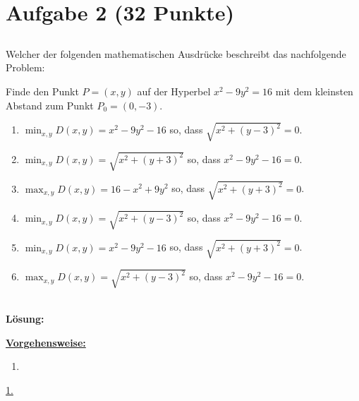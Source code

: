 \section*{Aufgabe 2 (32 Punkte)}
\vspace{0.4cm}
\subsection*{}
Welcher der folgenden mathematischen Ausdrücke beschreibt das nachfolgende Problem:
\begin{displayquote}
	Finde den Punkt $P = (x,y)$ auf der Hyperbel $x^2 - 9 y^2 = 16$ mit dem kleinsten
	Abstand zum Punkt $P_0 = (0,-3)$.
\end{displayquote}
\renewcommand{\labelenumi}{(\alph{enumi})}
\begin{enumerate}
	\item 
	$\min_{x,y} D(x,y) = x^2 - 9y^2 - 16$ so, dass
	$\sqrt{x^2 + (y-3)^2} = 0$.
	\item 
	$\min_{x,y} D(x,y) = \sqrt{x^2 + ( y + 3)^2}$ so, dass
	$x^2 - 9 y^2 - 16  = 0$.
	\item 
	$\max_{x,y} D(x,y) = 16 - x^2 + 9y^2 $ so, dass
	$\sqrt{x^2 + (y+3)^2} = 0$.
	\item 
	$\min_{x,y} D(x,y) = \sqrt{x^2 + ( y - 3)^2}$ so, dass
	$x^2 - 9 y^2 - 16  = 0$.
	\item 
	$\min_{x,y} D(x,y) = x^2 - 9y^2 - 16$ so, dass
	$\sqrt{x^2 + (y+3)^2} = 0$.
	\item
	$\max_{x,y} D(x,y) = \sqrt{x^2 + ( y - 3)^2}$ so, dass
	$x^2 - 9 y^2 - 16  = 0$.
\end{enumerate}
\ \\
\textbf{Lösung:}
\begin{mdframed}
\underline{\textbf{Vorgehensweise:}}
\renewcommand{\labelenumi}{\theenumi.}
\begin{enumerate}
\item 
\end{enumerate}
\end{mdframed}

\underline{1. }\\

\newpage

